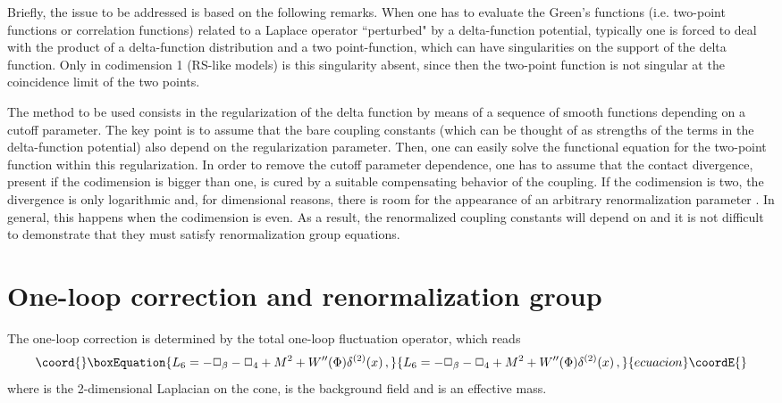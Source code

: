 \documentclass[a4paper,aps,prl,preprint,groupedaddress,showpacs,nobibnotes,tightenlines]{revtex4}
\begin{document}
Briefly, the issue to be addressed is based on the following remarks. 
When one has  to evaluate the Green's functions (i.e. two-point functions or 
correlation functions)  related to a Laplace operator ``perturbed" by a 
delta-function potential, typically one is forced to deal with the product of 
a delta-function distribution and a two point-function, 
which can have singularities on 
the support of the delta function. Only in codimension 1 (RS-like models) 
is this singularity absent, since then 
the two-point function is not singular at 
the coincidence limit of the two points.  

The method to be used \cite{faddeev} consists in the 
regularization of the delta function by means of a  sequence of smooth  
functions depending on 
a cutoff parameter. The key point is to assume that the bare coupling
constants (which can be thought of as strengths of the terms in
the delta-function
potential) also depend on the regularization parameter.  
Then, one can easily solve  the 
functional equation for the two-point function within this regularization. 
In order to remove the 
cutoff parameter dependence, one has to assume that the contact divergence, 
present if the 
codimension is bigger than one, is cured  by a suitable compensating 
behavior of the coupling. If the
codimension is two, the divergence is only logarithmic and, 
for dimensional reasons,  there is room for the appearance  of an 
arbitrary renormalization parameter \myHighlight{$\mu$}\coordHE{}. 
In general, this happens when the codimension is even.  
As a result, the renormalized coupling constants will depend on \myHighlight{$\mu$}\coordHE{} and 
it is not difficult to demonstrate that they must satisfy renormalization 
group equations.


\section{One-loop correction and renormalization group}
 
The one-loop correction is determined by the  total one-loop fluctuation 
operator, which  reads 
\begin{equation}\coord{}\boxEquation{
L_6 = -\Box_\beta -\Box_4+M^2+W''(\Phi)\delta^{(2)}(x)\,, 
\label{3}
}{
L_6 = -\Box_\beta -\Box_4+M^2+W''(\Phi)\delta^{(2)}(x)\,, 
}{ecuacion}\coordE{}\end{equation}
where \myHighlight{$\Box_\beta$}\coordHE{} is the 2-dimensional Laplacian on the cone, \myHighlight{$ \Phi $}\coordHE{} 
is the background field and \coordHE{} is an 
effective mass.
\end{document}

